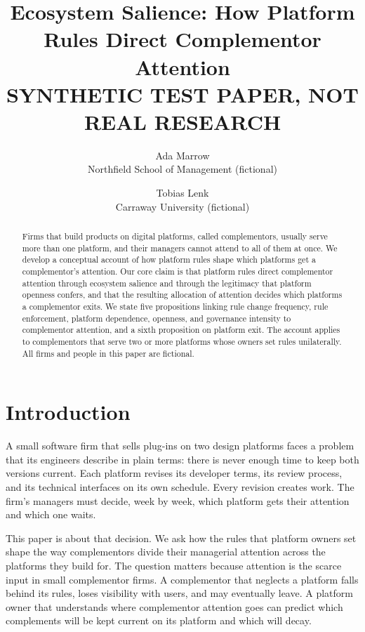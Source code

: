 \documentclass[12pt]{article}
\title{Ecosystem Salience: How Platform Rules Direct Complementor Attention\\[0.8em]
\normalsize\textbf{SYNTHETIC TEST PAPER, NOT REAL RESEARCH}}
\author{Ada Marrow\\ Northfield School of Management (fictional)
\and Tobias Lenk\\ Carraway University (fictional)}
\date{}
\begin{document}
\maketitle

\begin{abstract}
\noindent Firms that build products on digital platforms, called complementors, usually serve more than one platform, and their managers cannot attend to all of them at once. We develop a conceptual account of how platform rules shape which platforms get a complementor's attention. Our core claim is that platform rules direct complementor attention through ecosystem salience and through the legitimacy that platform openness confers, and that the resulting allocation of attention decides which platforms a complementor exits. We state five propositions linking rule change frequency, rule enforcement, platform dependence, openness, and governance intensity to complementor attention, and a sixth proposition on platform exit. The account applies to complementors that serve two or more platforms whose owners set rules unilaterally. All firms and people in this paper are fictional.
\end{abstract}

\section{Introduction}

A small software firm that sells plug-ins on two design platforms faces a problem that its engineers describe in plain terms: there is never enough time to keep both versions current. Each platform revises its developer terms, its review process, and its technical interfaces on its own schedule. Every revision creates work. The firm's managers must decide, week by week, which platform gets their attention and which one waits.

This paper is about that decision. We ask how the rules that platform owners set shape the way complementors divide their managerial attention across the platforms they build for. The question matters because attention is the scarce input in small complementor firms. A complementor that neglects a platform falls behind its rules, loses visibility with users, and may eventually leave. A platform owner that understands where complementor attention goes can predict which complements will be kept current on its platform and which will decay.
\end{document}
